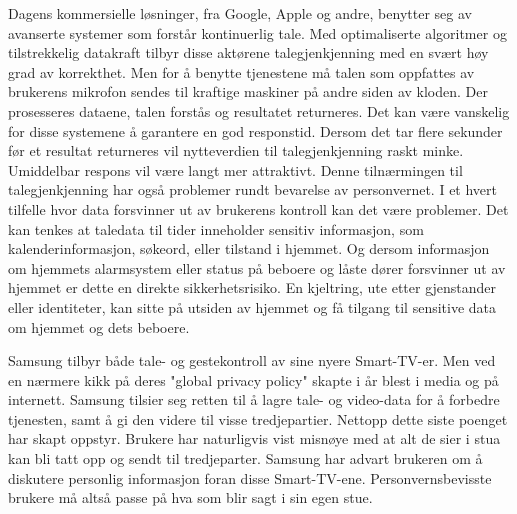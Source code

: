 Dagens kommersielle løsninger, fra Google, Apple og andre, benytter seg av avanserte systemer som forstår kontinuerlig tale. Med optimaliserte algoritmer og tilstrekkelig datakraft tilbyr disse aktørene talegjenkjenning med en svært høy grad av korrekthet. Men for å benytte tjenestene må talen som oppfattes av brukerens mikrofon sendes til kraftige maskiner på andre siden av kloden. Der prosesseres dataene, talen forstås og resultatet returneres. Det kan være vanskelig for disse systemene å garantere en god responstid. Dersom det tar flere sekunder før et resultat returneres vil nytteverdien til talegjenkjenning raskt minke. Umiddelbar respons vil være langt mer attraktivt. Denne tilnærmingen til talegjenkjenning har også problemer rundt bevarelse av personvernet. I et hvert tilfelle hvor data forsvinner ut av brukerens kontroll kan det være problemer. Det kan tenkes at taledata til tider inneholder sensitiv informasjon, som kalenderinformasjon, søkeord, eller tilstand i hjemmet. Og dersom informasjon om hjemmets alarmsystem eller status på beboere og låste dører forsvinner ut av hjemmet er dette en direkte sikkerhetsrisiko. En kjeltring, ute etter gjenstander eller identiteter, kan sitte på utsiden av hjemmet og få tilgang til sensitive data om hjemmet og dets beboere.

Samsung tilbyr både tale- og gestekontroll av sine nyere Smart-TV-er. Men ved en nærmere kikk på deres "global privacy policy" skapte i år blest i media og på internett. Samsung tilsier seg retten til å lagre tale- og video-data for å forbedre tjenesten, samt å gi den videre til visse tredjepartier. Nettopp dette siste poenget har skapt oppstyr. Brukere har naturligvis vist misnøye med at alt de sier i stua kan bli tatt opp og sendt til tredjeparter. Samsung har advart brukeren om å diskutere personlig informasjon foran disse Smart-TV-ene. Personvernsbevisste brukere må altså passe på hva som blir sagt i sin egen stue. 

